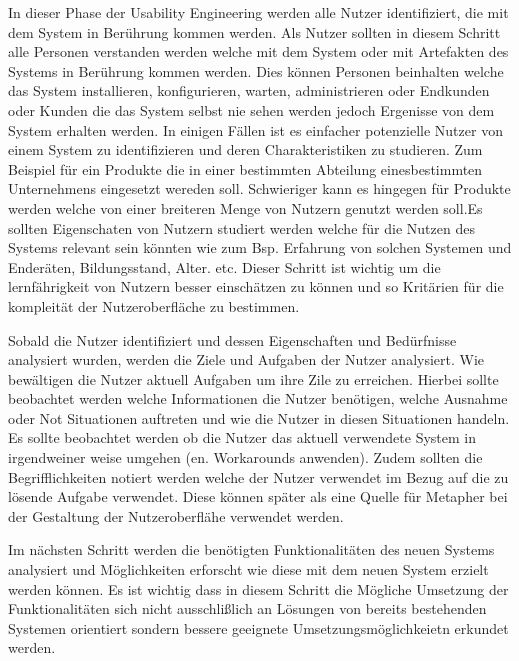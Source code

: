 In dieser Phase der Usability Engineering werden alle Nutzer identifiziert, die mit dem System in Berührung kommen werden. Als Nutzer sollten in diesem Schritt alle Personen 
verstanden werden welche mit dem System oder mit Artefakten des Systems in Berührung kommen werden. Dies können Personen beinhalten welche das System installieren, konfigurieren, 
warten, administrieren oder Endkunden oder Kunden die das System selbst nie sehen werden jedoch Ergenisse von dem System erhalten werden.  In einigen Fällen ist es einfacher potenzielle 
Nutzer von einem System zu identifizieren und deren Charakteristiken zu studieren. Zum Beispiel für ein Produkte die in einer bestimmten Abteilung einesbestimmten Unternehmens eingesetzt 
wereden soll. Schwieriger kann es hingegen für Produkte werden welche von einer breiteren Menge von Nutzern genutzt werden soll.Es sollten Eigenschaten von Nutzern studiert werden 
welche für die Nutzen des Systems relevant sein könnten wie zum Bsp. Erfahrung von solchen Systemen und Enderäten, Bildungsstand, Alter. etc. Dieser Schritt ist wichtig um die lernfährigkeit 
von Nutzern besser einschätzen zu können und so Kritärien für die kompleität der Nutzeroberfläche zu bestimmen.

Sobald die Nutzer identifiziert und dessen Eigenschaften und Bedürfnisse analysiert wurden, werden die Ziele und Aufgaben der Nutzer analysiert. 
Wie bewältigen die  Nutzer  aktuell Aufgaben um ihre Zile zu erreichen. Hierbei sollte beobachtet werden welche Informationen die Nutzer benötigen, welche Ausnahme oder Not Situationen  
auftreten und wie die Nutzer in diesen Situationen handeln. Es sollte beobachtet werden ob die Nutzer das aktuell verwendete System in irgendweiner  weise umgehen (en. Workarounds anwenden). 
Zudem sollten die Begrifflichkeiten notiert werden welche der Nutzer verwendet im Bezug auf die zu lösende Aufgabe verwendet.  Diese können später als eine Quelle für Metapher bei der Gestaltung 
der Nutzeroberflähe verwendet werden. 


Im nächsten Schritt werden die benötigten Funktionalitäten des neuen Systems analysiert und Möglichkeiten erforscht wie diese mit dem neuen System erzielt werden können. 
Es ist wichtig dass in diesem Schritt die Mögliche Umsetzung der Funktionalitäten sich nicht ausschlißlich an Lösungen von bereits bestehenden Systemen orientiert sondern 
bessere geeignete Umsetzungsmöglichkeietn erkundet werden.

